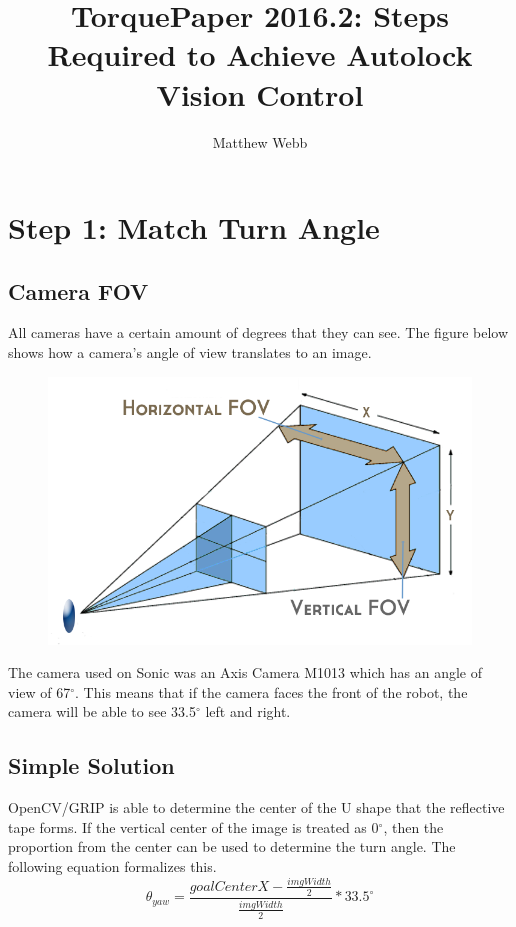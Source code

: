 \documentclass[a4paper,12pt]{report}
\author{Matthew Webb}
\title{TorquePaper 2016.2: Steps Required to Achieve Autolock Vision Control}
\newcommand{\tab}{\hspace{20pt}}
\begin{document}
	\maketitle
	\tableofcontents
	
	\chapter{Step 1: Match Turn Angle}
	\section{Camera FOV}
	\tab All cameras have a certain amount of degrees that they can see. The figure below shows how a camera's angle of view translates to an image.
	
	\begin{figure}[h]
		\centering
		\includegraphics[scale=.3]{camerafov.png}
	\end{figure}
	
	\tab The camera used on Sonic was an Axis Camera M1013 which has an angle of view of 67$^{\circ}$. This means that if the camera faces the front of the robot, the camera will be able to see 33.5$^{\circ}$ left and right.
	\section{Simple Solution}
	\tab OpenCV/GRIP is able to determine the center of the U shape that the reflective tape forms. If the vertical center of the image is treated as 0$^{\circ}$, then the proportion from the center can be used to determine the turn angle. The following equation formalizes this.
	\[\theta_{yaw} = \frac{goalCenterX - \frac{imgWidth}{2}}{\frac{imgWidth}{2}} * 33.5^{\circ}\]
\end{document}
